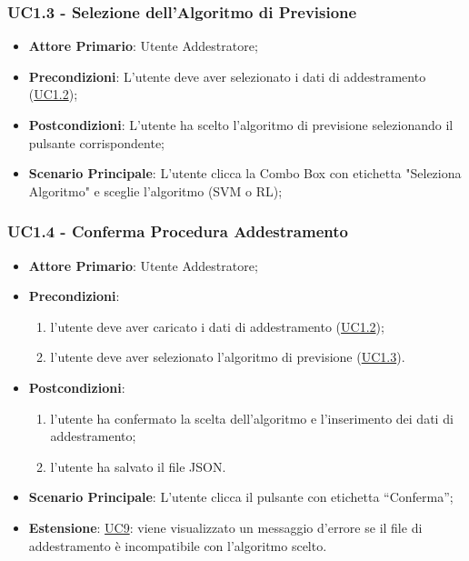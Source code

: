 		\subsubsection{UC1.3 - Selezione dell’Algoritmo di Previsione}
		\begin{itemize}
			\item\textbf{Attore Primario}: Utente Addestratore;
			\item\textbf{Precondizioni}: L’utente deve aver selezionato i dati di addestramento (\hyperref[par:UC1.2]{UC1.2}); 
			\item\textbf{Postcondizioni}: L’utente ha scelto l’algoritmo di previsione selezionando il pulsante corrispondente;
			\item\textbf{Scenario Principale}: L’utente clicca la Combo Box con etichetta "Seleziona Algoritmo" e sceglie l’algoritmo (SVM o RL);
		\end{itemize}
	
	\label{par:UC1.4}
	\subsubsection{UC1.4 - Conferma Procedura Addestramento}
		\begin{itemize}
			\item\textbf{Attore Primario}: Utente Addestratore;
			\item\textbf{Precondizioni}:
				\begin{enumerate}
					\item l’utente deve aver caricato i dati di addestramento (\hyperref[par:UC1.2]{UC1.2});
					\item  l’utente deve aver selezionato l’algoritmo di previsione (\hyperref[par:UC1.3]{UC1.3}).
				\end{enumerate}
			\item\textbf{Postcondizioni}:
				\begin{enumerate}
					\item l’utente ha confermato la scelta dell’algoritmo e l’inserimento dei dati di addestramento;
					\item l'utente ha salvato il file JSON.
				\end{enumerate}
			\item\textbf{Scenario Principale}: L’utente clicca il pulsante con etichetta “Conferma”;
			\item\textbf{Estensione}: \hyperref[par:UC9]{UC9}: viene visualizzato un messaggio d’errore se il file di addestramento è incompatibile con l’algoritmo scelto. 	
		\end{itemize}

